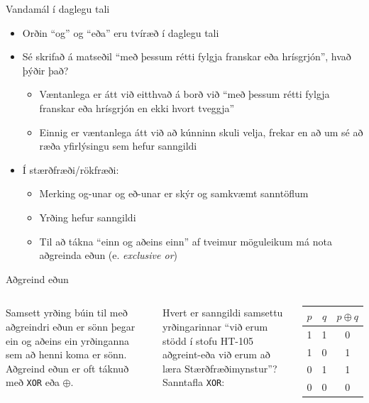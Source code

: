 \documentclass[handout]{beamer}
\begin{document}
\begin{frame}{Vandamál í daglegu tali}
\begin{itemize}
 \item Orðin ``og'' og ``eða'' eru tvíræð í daglegu tali
 \item Sé skrifað á matseðil ``með þessum rétti fylgja franskar eða hrísgrjón'', hvað þýðir það?\pause
 \begin{itemize}
  \item Væntanlega er átt við eitthvað á borð við ``með þessum rétti fylgja franskar eða hrísgrjón en ekki hvort tveggja''
  \item Einnig er væntanlega átt við að kúnninn skuli velja, frekar en að um sé að ræða yfirlýsingu sem hefur sanngildi \pause
 \end{itemize}
 \item Í stærðfræði/rökfræði: 
 \begin{itemize}
  \item Merking og-unar og eð-unar er skýr og samkvæmt sanntöflum
  \item Yrðing hefur sanngildi
  \item Til að tákna ``einn og aðeins einn'' af tveimur möguleikum má nota aðgreinda eðun (e. \emph{exclusive or})
 \end{itemize}
\end{itemize}
\end{frame}

\begin{frame}{Aðgreind eðun}
\begin{columns}
Samsett yrðing búin til með aðgreindri eðun er sönn þegar ein og aðeins ein yrðinganna sem að henni koma er sönn. Aðgreind eðun er oft táknuð með \texttt{XOR} eða $\oplus$.

\vspace*{0.5cm}
Hvert er sanngildi samsettu yrðingarinnar ``við erum stödd í stofu HT-105 aðgreint-eða við erum að læra Stærðfræðimynstur''?
Sanntafla \texttt{XOR}:
\begin{center}
\begin{tabular}{ccc}
\toprule
$p$&$q$&$p \oplus q$ \\
\midrule
1&1&0\\
1&0&1\\
0&1&1\\
0&0&0\\
\bottomrule
\end{tabular}
\end{center}
\end{columns}
\end{frame}
\end{document}
